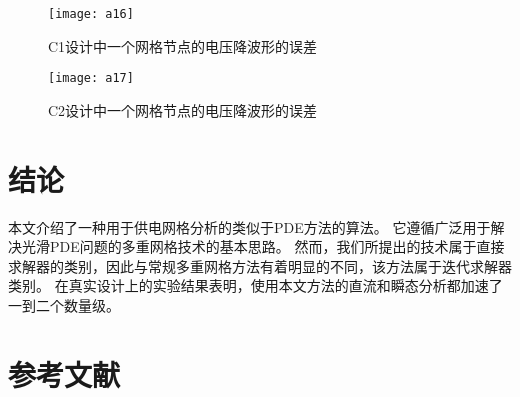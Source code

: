 \begin{figure}[H] %
  \centering
  \texttt{[image: a16]}
  \caption{C1设计中一个网格节点的电压降波形的误差}
  \label{fig:a16}
\end{figure}

\begin{figure}[H] %
  \centering
  \texttt{[image: a17]}
  \caption{C2设计中一个网格节点的电压降波形的误差}
  \label{fig:a17}
\end{figure}


\section{结论}
本文介绍了一种用于供电网格分析的类似于PDE方法的算法。 它遵循广泛用于解决光滑PDE问题的多重网格技术的基本思路。 然而，我们所提出的技术属于直接求解器的类别，因此与常规多重网格方法有着明显的不同，该方法属于迭代求解器类别。 在真实设计上的实验结果表明，使用本文方法的直流和瞬态分析都加速了一到二个数量级。

\section*{参考文献}

